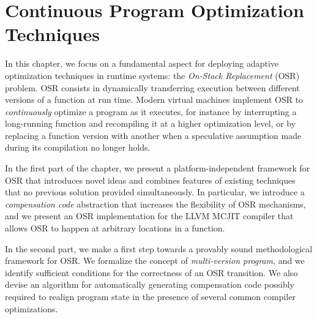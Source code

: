 
\chapter{Continuous Program Optimization Techniques}
\label{ch:continuous}

In this chapter, we focus on a fundamental aspect for deploying adaptive optimization techniques in runtime systems: the {\em On-Stack Replacement} (OSR) problem. OSR consists in dynamically transferring execution between different versions of a function at run time. Modern virtual machines implement OSR to {\em continuously} optimize a program as it executes, for instance by interrupting a long-running function and recompiling it at a higher optimization level, or by replacing a function version with another when a speculative assumption made during its compilation no longer holds.

In the first part of the chapter, we present a platform-independent framework for OSR that introduces novel ideas and combines features of existing techniques that no previous solution provided simultaneously. In particular, we introduce a {\em compensation code} abstraction that increases the flexibility of OSR mechanisms, and we present an OSR implementation for the LLVM MCJIT compiler that allows OSR to happen at arbitrary locations in a function.

In the second part, we make a first step towards a provably sound methodological framework for OSR. We formalize the concept of {\em multi-version program}, and we identify sufficient conditions for the correctness of an OSR transition. We also devise an algorithm for automatically generating compensation code possibly required to realign program state in the presence of several common compiler optimizations.



